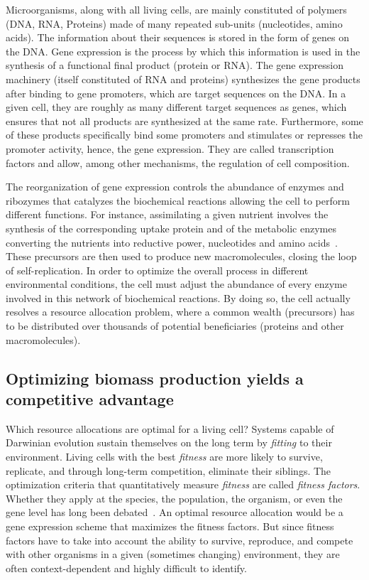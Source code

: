 Microorganisms, along with all living cells, are mainly constituted of polymers (DNA, RNA, Proteins) made of many repeated sub-units (nucleotides, amino acids).
The information about their sequences is stored in the form of genes on the DNA.
Gene expression is the process by which this information is used in the synthesis of a functional final product (protein or RNA).
The gene expression machinery (itself constituted of RNA and proteins) synthesizes the gene products after binding to gene promoters, which are target sequences on the DNA.
In a given cell, they are roughly as many different target sequences as genes, which ensures that not all products are synthesized at the same rate.
Furthermore, some of these products specifically bind some promoters and stimulates or represses the promoter activity, hence, the gene expression.
They are called transcription factors and allow, among other mechanisms, the regulation of cell composition.

The reorganization of gene expression controls the abundance of enzymes and ribozymes that catalyzes the biochemical reactions allowing the cell to perform different functions.
For instance, assimilating a given nutrient involves the synthesis of the corresponding uptake protein and of the metabolic enzymes converting the nutrients into reductive power, nucleotides and amino acids~\cite{schaechter_microbe_2006}.
These precursors are then used to produce new macromolecules, closing the loop of self-replication.
In order to optimize the overall process in different environmental conditions, the cell must adjust the abundance of every enzyme involved in this network of biochemical reactions.
By doing so, the cell actually resolves a resource allocation problem, where a common wealth (precursors) has to be distributed over thousands of potential beneficiaries (proteins and other macromolecules).

\subsection{Optimizing biomass production yields a competitive advantage}

Which resource allocations are optimal for a living cell?
Systems capable of Darwinian evolution sustain themselves on the long term by \textit{fitting} to their environment.
Living cells with the best \textit{fitness} are more likely to survive, replicate, and through long-term competition, eliminate their siblings.
The optimization criteria that quantitatively measure \textit{fitness} are called \textit{fitness factors}.
Whether they apply at the species, the population, the organism, or even the gene level has long been debated~\cite{dawkins_selfish_1976}.
An optimal resource allocation would be a gene expression scheme that maximizes the fitness factors.
But since fitness factors have to take into account the ability to survive, reproduce, and compete with other organisms in a given (sometimes changing) environment, they are often context-dependent and highly difficult to identify.

